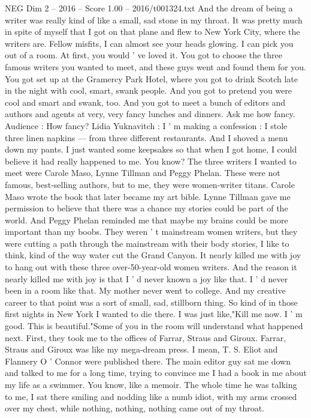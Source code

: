 \begin{textsample}{NEG Dim 2 – 2016 – Score 1.00 – 2016/t001324.txt}
And the dream of being a writer was really kind of like a small, sad stone in my throat.
It was pretty much in spite of myself that I got on that plane and flew to New York City, where the writers are.
Fellow misfits, I can almost see your heads glowing.
I can pick you out of a room.
At first, you would ' ve loved it.
You got to choose the three famous writers you wanted to meet, and these guys went and found them for you.
You got set up at the Gramercy Park Hotel, where you got to drink Scotch late in the night with cool, smart, swank people.
And you got to pretend you were cool and smart and swank, too.
And you got to meet a bunch of editors and authors and agents at very, very fancy lunches and dinners.
Ask me how fancy.
Audience : How fancy?
Lidia Yuknavitch : I ' m making a confession : I stole three linen napkins — from three different restaurants.
And I shoved a menu down my pants.
I just wanted some keepsakes so that when I got home, I could believe it had really happened to me.
You know?
The three writers I wanted to meet were Carole Maso, Lynne Tillman and Peggy Phelan.
These were not famous, best-selling authors, but to me, they were women-writer titans.
Carole Maso wrote the book that later became my art bible.
Lynne Tillman gave me permission to believe that there was a chance my stories could be part of the world.
And Peggy Phelan reminded me that maybe my brains could be more important than my boobs.
They weren ' t mainstream women writers, but they were cutting a path through the mainstream with their body stories, I like to think, kind of the way water cut the Grand Canyon.
It nearly killed me with joy to hang out with these three over-50-year-old women writers.
And the reason it nearly killed me with joy is that I ' d never known a joy like that.
I ' d never been in a room like that.
My mother never went to college.
And my creative career to that point was a sort of small, sad, stillborn thing.
So kind of in those first nights in New York I wanted to die there.
I was just like,"Kill me now.
I ' m good.
This is beautiful."Some of you in the room will understand what happened next.
First, they took me to the offices of Farrar, Straus and Giroux.
Farrar, Straus and Giroux was like my mega-dream press.
I mean, T.
S.
Eliot and Flannery O ' Connor were published there.
The main editor guy sat me down and talked to me for a long time, trying to convince me I had a book in me about my life as a swimmer.
You know, like a memoir.
The whole time he was talking to me, I sat there smiling and nodding like a numb idiot, with my arms crossed over my chest, while nothing, nothing, nothing came out of my throat.

\end{textsample}
